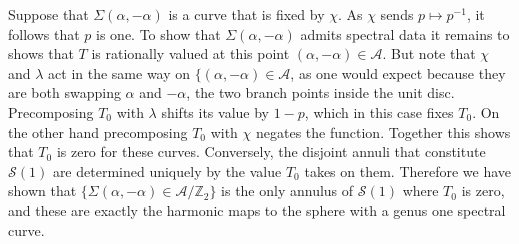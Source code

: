\documentclass{article}
\begin{document}
Suppose that $\Sigma(\alpha,-\alpha)$ is a curve that is fixed by $\chi$. As $\chi$ sends $p \mapsto p^{-1}$, it follows that $p$ is one. To show that $\Sigma(\alpha,-\alpha)$ admits spectral data it remains to shows that $T$ is rationally valued at this point $(\alpha,-\alpha) \in \mathcal{A}$. But note that $\chi$ and $\lambda$ act in the same way on $\{(\alpha,-\alpha) \in \mathcal{A}$, as one would expect because they are both swapping $\alpha$ and $-\alpha$, the two branch points inside the unit disc. Precomposing $T_0$ with $\lambda$ shifts its value by $1-p$, which in this case fixes $T_0$. On the other hand precomposing $T_0$ with $\chi$ negates the function. Together this shows that $T_0$ is zero for these curves. Conversely, the disjoint annuli that constitute $\mathcal{S}(1)$ are determined uniquely by the value $T_0$ takes on them.
Therefore we have shown that $\{\Sigma(\alpha,-\alpha) \in \mathcal{A}/\mathbb{Z}_2\}$ is the only annulus of $\mathcal{S}(1)$ where $T_0$ is zero, and these are exactly the harmonic maps to the sphere with a genus one spectral curve.












\end{document}

